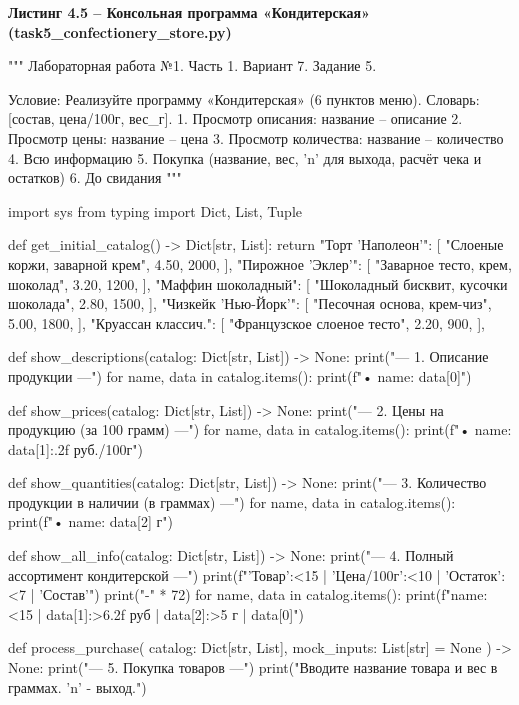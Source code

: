 \documentclass[14pt,a4paper]{extarticle}
\newcommand{\listingtitle}[1]{%
  \par\vspace{8pt}%
  \noindent\hspace*{1.25cm}\textbf{#1}\par\vspace{2pt}%
}
\begin{document}
\listingtitle{Листинг 4.5 -- Консольная программа «Кондитерская» (task5\_confectionery\_store.py)}
\begin{CodeListing}
"""
Лабораторная работа №1. Часть 1.
Вариант 7. Задание 5.

Условие:
Реализуйте программу «Кондитерская» (6 пунктов меню).
Словарь: [состав, цена/100г, вес_г].
1. Просмотр описания: название – описание
2. Просмотр цены: название – цена
3. Просмотр количества: название – количество
4. Всю информацию
5. Покупка (название, вес, 'n' для выхода, расчёт чека и остатков)
6. До свидания
"""

import sys
from typing import Dict, List, Tuple


def get_initial_catalog() -> Dict[str, List]:
    return {
        "Торт 'Наполеон'": [
            "Слоеные коржи, заварной крем",
            4.50,
            2000,
        ],
        "Пирожное 'Эклер'": [
            "Заварное тесто, крем, шоколад",
            3.20,
            1200,
        ],
        "Маффин шоколадный": [
            "Шоколадный бисквит, кусочки шоколада",
            2.80,
            1500,
        ],
        "Чизкейк 'Нью-Йорк'": [
            "Песочная основа, крем-чиз",
            5.00,
            1800,
        ],
        "Круассан классич.": [
            "Французское слоеное тесто",
            2.20,
            900,
        ],
    }


def show_descriptions(catalog: Dict[str, List]) -> None:
    print("\n--- 1. Описание продукции ---")
    for name, data in catalog.items():
        print(f"• {name}: {data[0]}")


def show_prices(catalog: Dict[str, List]) -> None:
    print("\n--- 2. Цены на продукцию (за 100 грамм) ---")
    for name, data in catalog.items():
        print(f"• {name}: {data[1]:.2f} руб./100г")


def show_quantities(catalog: Dict[str, List]) -> None:
    print("\n--- 3. Количество продукции в наличии (в граммах) ---")
    for name, data in catalog.items():
        print(f"• {name}: {data[2]} г")


def show_all_info(catalog: Dict[str, List]) -> None:
    print("\n--- 4. Полный ассортимент кондитерской ---")
    print(f"{'Товар':<15} | {'Цена/100г':<10} | {'Остаток':<7} | {'Состав'}")
    print("-" * 72)
    for name, data in catalog.items():
        print(f"{name:<15} | {data[1]:>6.2f} руб | {data[2]:>5} г | {data[0]}")


def process_purchase(
    catalog: Dict[str, List], mock_inputs: List[str] = None
) -> None:
    print("\n--- 5. Покупка товаров ---")
    print("Вводите название товара и вес в граммах. 'n' - выход.")


\end{CodeListing}
\end{document}
